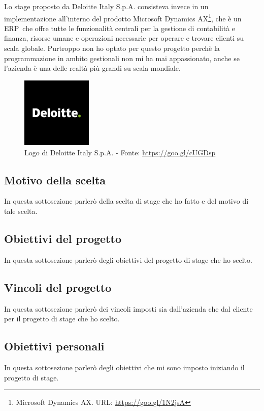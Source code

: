 Lo stage proposto da Deloitte Italy S.p.A. consisteva invece in un implementazione all'interno del prodotto Microsoft Dynamics AX\footnote{Microsoft Dynamics AX. URL: \url{https://goo.gl/1N2jsA}}, che è un ERP\glossario\ che offre tutte le funzionalità centrali per la gestione di contabilità e finanza, risorse umane e operazioni necessarie per operare e trovare clienti su scala globale. Purtroppo non ho optato per questo progetto perchè la programmazione in ambito gestionali non mi ha mai appassionato, anche se l'azienda è una delle realtà più grandi su scala mondiale.\\
	\begin{figure}[H]
		\centering
	   	\includegraphics[width=0.3\textwidth]{immagini/deloitte}
	   	\caption{Logo di Deloitte Italy S.p.A. - Fonte: \url{https://goo.gl/cUGDsp}}
	\end{figure}

\subsection{Motivo della scelta}
In questa sottosezione parlerò della scelta di stage che ho fatto e del motivo di tale scelta.

\subsection{Obiettivi del progetto}
In questa sottosezione parlerò degli obiettivi del progetto di stage che ho scelto.

\subsection{Vincoli del progetto}
In questa sottosezione parlerò dei vincoli imposti sia dall'azienda che dal cliente per il progetto di stage che ho scelto.

\subsection{Obiettivi personali}
In questa sottosezione parlerò degli obiettivi che mi sono imposto iniziando il progetto di stage.
